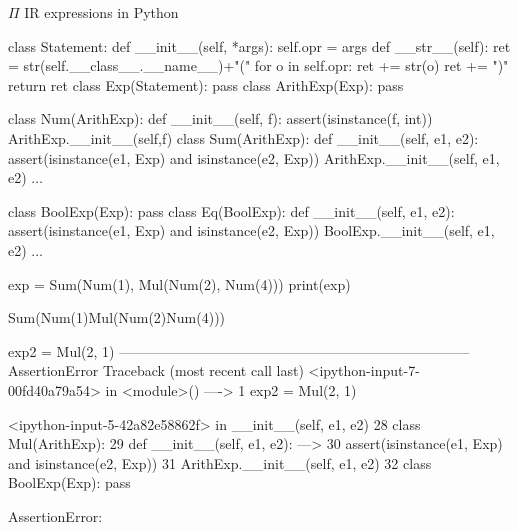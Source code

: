\documentclass{beamer}
\begin{document}
\begin{frame}{{\color{red}$\Pi$ IR} expressions in Python}


\begin{python}
class Statement: 
    def __init__(self, *args):
        self.opr = args
    def __str__(self):
        ret = str(self.__class__.__name__)+"("
        for o in self.opr:
            ret += str(o)
        ret += ")"
        return ret
class Exp(Statement): pass
class ArithExp(Exp): pass
\end{python}

\framebreak

\begin{python}
class Num(ArithExp): 
    def __init__(self, f): 
        assert(isinstance(f, int))
        ArithExp.__init__(self,f)
class Sum(ArithExp): 
    def __init__(self, e1, e2): 
        assert(isinstance(e1, Exp) and isinstance(e2, Exp))
        ArithExp.__init__(self, e1, e2)
$\ldots$
\end{python}

\framebreak

\begin{python}
class BoolExp(Exp): pass
class Eq(BoolExp):
    def __init__(self, e1, e2):
        assert(isinstance(e1, Exp) and isinstance(e2, Exp))
        BoolExp.__init__(self, e1, e2)
$\ldots$
\end{python}

\framebreak

\begin{python}
exp = Sum(Num(1), Mul(Num(2), Num(4)))
print(exp)

Sum(Num(1)Mul(Num(2)Num(4)))
\end{python}

\framebreak

\begin{python}
exp2 = Mul(2, 1)
---------------------------------------------------------------------------
AssertionError                            Traceback (most recent call last)
<ipython-input-7-00fd40a79a54> in <module>()
----> 1 exp2 = Mul(2, 1)

<ipython-input-5-42a82e58862f> in __init__(self, e1, e2)
     28 class Mul(ArithExp):
     29     def __init__(self, e1, e2):
---> 30         assert(isinstance(e1, Exp) and isinstance(e2, Exp))
     31         ArithExp.__init__(self, e1, e2)
     32 class BoolExp(Exp): pass

AssertionError: 
\end{python}
\end{frame}
\end{document}
